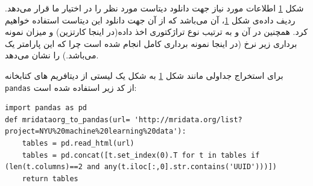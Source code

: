 \begin{figure}[t!]
	\centering
	\removevspace[1]
	\caption{}
	\label{fig:mridata-org-fields}
\end{figure}

شکل \ref{fig:mridata-org-fields}
اطلاعات مورد نیاز جهت دانلود دیتاست مورد نظر را در اختیار ما قرار می‌دهد. ردیف داده‌ی شکل \ref{fig:mridata-org-fields}، 
آن می‌باشد که از آن جهت دانلود این دیتاست استفاده خواهیم کرد. همچنین در آن  و 
به ترتیب نوع تراژکتوری اخذ داده(در اینجا کارتزین) و میزان نمونه برداری زیر نرخ (در اینجا نمونه برداری کامل انجام شده است چرا که این پارامتر یک می‌باشد.) را نشان می‌دهد.

برای استخراج جداولی مانند شکل \ref{fig:mridata-org-fields} به شکل یک لیستی از دیتافریم های کتابخانه \texttt{pandas} از کد زیر استفاده شده است:

\begin{latin}
\begin{lstlisting}
import pandas as pd
def mridataorg_to_pandas(url= 'http://mridata.org/list?project=NYU%20machine%20learning%20data'):
	tables = pd.read_html(url)
	tables = pd.concat([t.set_index(0).T for t in tables if (len(t.columns)==2 and any(t.iloc[:,0].str.contains('UUID')))])
	return tables
\end{lstlisting}
\end{latin}



